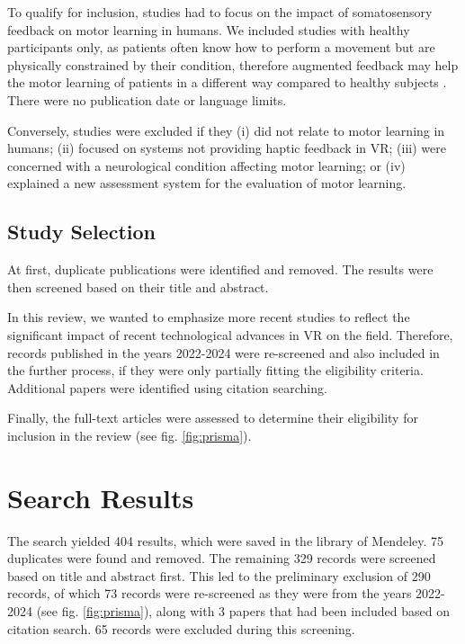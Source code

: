 To qualify for inclusion, studies had to focus on the impact of somatosensory feedback on motor learning in humans. We included studies with healthy participants only, as patients often know how to perform a movement but are physically constrained by their condition, therefore augmented feedback may help the motor learning of patients in a different way compared to healthy subjects \cite{Sigrist2013AugmentedReview}. There were no publication date or language limits.

Conversely, studies were excluded if they (i) did not relate to motor learning in humans; (ii) focused on systems not providing haptic feedback in VR; (iii) were concerned with a neurological condition affecting motor learning; or (iv) explained a new assessment system for the evaluation of motor learning.

\subsection{Study Selection}
At first, duplicate publications were identified and removed. The results were then screened based on their title and abstract. 

In this review, we wanted to emphasize more recent studies to reflect the significant impact of recent technological advances in VR on the field. Therefore, records published in the years 2022-2024 were re-screened and also included in the further process, if they were only partially fitting the eligibility criteria. Additional papers were identified using citation searching.

Finally, the full-text articles were assessed to determine their eligibility for inclusion in the review (see fig. \ref{fig:prisma}).


\section{Search Results}


The search yielded 404 results, which were saved in the library of Mendeley. 75 duplicates were found and removed. The remaining 329 records were screened based on title and abstract first. This led to the preliminary exclusion of 290 records, of which 73 records were re-screened as they were from the years 2022-2024 (see fig. \ref{fig:prisma}), along with 3 papers that had been included based on citation search. 
65 records were excluded during this screening.

